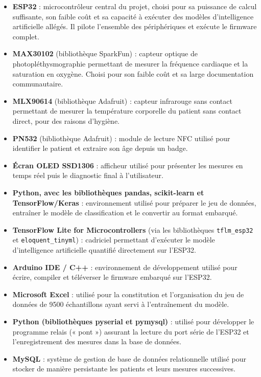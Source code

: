 \documentclass[12pt,a4paper]{report}
\begin{document}
\begin{itemize}
    \item \textbf{ESP32} : microcontrôleur central du projet, choisi pour sa puissance de calcul suffisante, son faible coût et sa capacité à exécuter des modèles d'intelligence artificielle allégés. Il pilote l'ensemble des périphériques et exécute le firmware complet.
    \item \textbf{MAX30102} (bibliothèque SparkFun) : capteur optique de photopléthysmographie permettant de mesurer la fréquence cardiaque et la saturation en oxygène. Choisi pour son faible coût et sa large documentation communautaire.
    \item \textbf{MLX90614} (bibliothèque Adafruit) : capteur infrarouge sans contact permettant de mesurer la température corporelle du patient sans contact direct, pour des raisons d'hygiène.
    \item \textbf{PN532} (bibliothèque Adafruit) : module de lecture NFC utilisé pour identifier le patient et extraire son âge depuis un badge.
    \item \textbf{Écran OLED SSD1306} : afficheur utilisé pour présenter les mesures en temps réel puis le diagnostic final à l'utilisateur.
    \item \textbf{Python, avec les bibliothèques pandas, scikit-learn et TensorFlow/Keras} : environnement utilisé pour préparer le jeu de données, entraîner le modèle de classification et le convertir au format embarqué.
    \item \textbf{TensorFlow Lite for Microcontrollers} (via les bibliothèques \texttt{tflm\_esp32} et \texttt{eloquent\_tinyml}) : cadriciel permettant d'exécuter le modèle d'intelligence artificielle quantifié directement sur l'ESP32.
    \item \textbf{Arduino IDE / C++} : environnement de développement utilisé pour écrire, compiler et téléverser le firmware embarqué sur l'ESP32.
    \item \textbf{Microsoft Excel} : utilisé pour la constitution et l'organisation du jeu de données de 9500 échantillons ayant servi à l'entraînement du modèle.
    \item \textbf{Python (bibliothèques pyserial et pymysql)} : utilisé pour développer le programme relais (« pont ») assurant la lecture du port série de l'ESP32 et l'enregistrement des mesures dans la base de données.
    \item \textbf{MySQL} : système de gestion de base de données relationnelle utilisé pour stocker de manière persistante les patients et leurs mesures successives.

\end{itemize}
\end{document}
